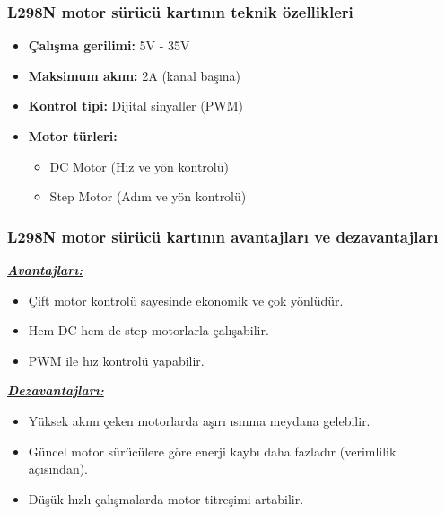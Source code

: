 \subsubsection{L298N motor sürücü kartının teknik özellikleri}

\begin{itemize}
\item \textbf{Çalışma gerilimi:} 5V - 35V
\item \textbf{Maksimum akım:} 2A (kanal başına)
\item \textbf{Kontrol tipi:} Dijital sinyaller (PWM)
\item \textbf{Motor türleri:}
\begin{itemize}
\item DC Motor (Hız ve yön kontrolü)
\item Step Motor (Adım ve yön kontrolü)
\end{itemize}
\end{itemize}

\subsubsection{L298N motor sürücü kartının avantajları ve dezavantajları}
\textbf{\textit{\underline{Avantajları:}}}
\begin{itemize}
\item Çift motor kontrolü sayesinde ekonomik ve çok yönlüdür.
\item Hem DC hem de step motorlarla çalışabilir.
\item PWM ile hız kontrolü yapabilir.
\end{itemize}

\textbf{\textit{\underline{Dezavantajları:}}}
\begin{itemize}
\item Yüksek akım çeken motorlarda aşırı ısınma meydana gelebilir.
\item Güncel motor sürücülere göre enerji kaybı daha fazladır (verimlilik açısından).
\item Düşük hızlı çalışmalarda motor titreşimi artabilir.
\end{itemize}

